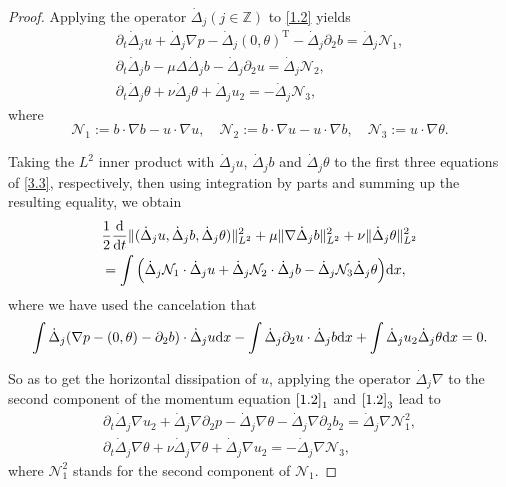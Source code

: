 \documentclass[reqno]{amsart}
\begin{document}
\begin{proof}
Applying the operator $\dot{\Delta}_j (j\in\mathbb{Z})$ to \eqref{1.2} yields
\begin{equation}\label{3.3}
\begin{gathered}
 \partial_t\dot{\Delta}_ju+\dot{\Delta}_j\nabla p-\dot{\Delta}_j (0,\theta)^\mathrm{T}-\dot{\Delta}_j\partial_2b=\dot{\Delta}_j \mathcal{N}_1,\\
 \partial_t\dot{\Delta}_jb-\mu\Delta \dot{\Delta}_jb-\dot{\Delta}_j\partial_2u=\dot{\Delta}_j\mathcal{N}_2,\\
 \partial_t\dot{\Delta}_j\theta+\nu\dot{\Delta}_j\theta+\dot{\Delta}_ju_2=-\dot{\Delta}_j \mathcal{N}_3,
\end{gathered}
\end{equation}
where
\[
 \mathcal{N}_1:=b\cdot \nabla b-u\cdot \nabla u, \quad
 \mathcal{N}_2:=b\cdot \nabla u-u\cdot \nabla b, \quad
 \mathcal{N}_3:=u\cdot \nabla \theta.
\]

Taking the $L^2$ inner product with $\dot{\Delta}_ju$, $\dot{\Delta}_jb$ and
$\dot{\Delta}_j\theta$ to the first three equations of \eqref{3.3}, respectively,
then using integration by parts and summing up the resulting equality, we obtain
\begin{equation}\label{3.4}
\begin{aligned}
 &\frac{1}{2}\frac{\rm d}{{\rm d}t}\|(\dot{\Delta}_ju,\dot{\Delta}_jb,
 \dot{\Delta}_j\theta)\|_{L^2}^2+\mu\|\nabla\dot{\Delta}_jb\|_{L^2}^2
 +\nu\|\dot{\Delta}_j\theta\|_{L^2}^2 \\
 &=\int\Big(\dot{\Delta}_j \mathcal{N}_1\cdot \dot{\Delta}_ju+\dot{\Delta}_j
 \mathcal{N}_2\cdot \dot{\Delta}_jb-\dot{\Delta}_j \mathcal{N}_3
 \dot{\Delta}_j\theta\Big){\rm d}x,
\end{aligned}
\end{equation}
where we have used the cancelation that
\[
 \int\dot{\Delta}_j(\nabla p-(0,\theta)-\partial_2b)\cdot\dot{\Delta}_j u{\rm d}x-\int\dot{\Delta}_j\partial_2u\cdot\dot{\Delta}_jb{\rm d}x+\int\dot{\Delta}_ju_2\dot{\Delta}_j\theta{\rm d}x=0.
\]

So as to get the horizontal dissipation of $u$, applying the operator
$\dot{\Delta}_j\nabla$ to the second component of the momentum equation $\eqref{1.2}_1$
and $\eqref{1.2}_3$ lead to
\begin{equation}\label{3.5}
\begin{gathered}
 \partial_t\dot{\Delta}_j\nabla u_2+\dot{\Delta}_j\nabla\partial_2 p-\dot{\Delta}_j\nabla \theta-\dot{\Delta}_j\nabla\partial_2b_2=\dot{\Delta}_j\nabla \mathcal{N}_1^2,\\
 \partial_t\dot{\Delta}_j\nabla\theta+\nu\dot{\Delta}_j\nabla\theta+\dot{\Delta}_j\nabla u_2=-\dot{\Delta}_j\nabla\mathcal{N}_3,
\end{gathered}
\end{equation}
where $\mathcal{N}_1^2$ stands for the second component of $\mathcal{N}_1$.


\end{proof}
\end{document}
